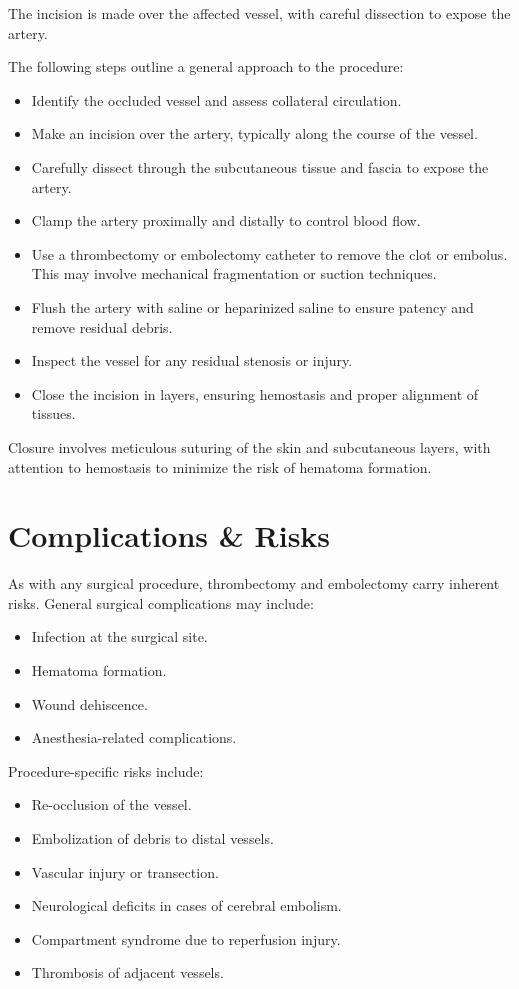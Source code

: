 The incision is made over the affected vessel, with careful dissection to expose the artery. 

The following steps outline a general approach to the procedure:

\begin{itemize}
    \item Identify the occluded vessel and assess collateral circulation.
    \item Make an incision over the artery, typically along the course of the vessel.
    \item Carefully dissect through the subcutaneous tissue and fascia to expose the artery.
    \item Clamp the artery proximally and distally to control blood flow.
    \item Use a thrombectomy or embolectomy catheter to remove the clot or embolus. This may involve mechanical fragmentation or suction techniques.
    \item Flush the artery with saline or heparinized saline to ensure patency and remove residual debris.
    \item Inspect the vessel for any residual stenosis or injury.
    \item Close the incision in layers, ensuring hemostasis and proper alignment of tissues.
\end{itemize}

Closure involves meticulous suturing of the skin and subcutaneous layers, with attention to hemostasis to minimize the risk of hematoma formation.

\section*{Complications \& Risks}

As with any surgical procedure, thrombectomy and embolectomy carry inherent risks. General surgical complications may include:

\begin{itemize}
    \item Infection at the surgical site.
    \item Hematoma formation.
    \item Wound dehiscence.
    \item Anesthesia-related complications.
\end{itemize}

Procedure-specific risks include:

\begin{itemize}
    \item Re-occlusion of the vessel.
    \item Embolization of debris to distal vessels.
    \item Vascular injury or transection.
    \item Neurological deficits in cases of cerebral embolism.
    \item Compartment syndrome due to reperfusion injury.
    \item Thrombosis of adjacent vessels.
\end{itemize}

